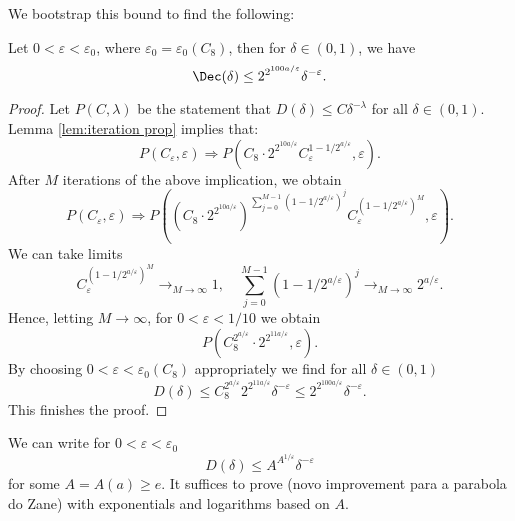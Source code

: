 We bootstrap this bound to find the following:
\begin{lem}
\label{lem:IntermediateResultMomentCurveIII}
Let $0<\varepsilon<\varepsilon_{0}$, where $\varepsilon_{0}=\varepsilon_{0}(C_{8})$, then for $\delta \in (0,1)$, we have
\begin{equation*}
\Dec(\delta) \leq 2^{2^{100a/\varepsilon}} \delta^{-\varepsilon}.
\end{equation*}
\end{lem}
\begin{proof}
Let $P(C,\lambda)$ be the statement that $D(\delta) \leq C \delta^{-\lambda}$ for all $\delta \in (0,1)$. Lemma \ref{lem:iteration prop} implies that:
\begin{equation*}
P(C_\varepsilon,\varepsilon) \Rightarrow P(C_{8} \cdot 2^{2^{10 a/\varepsilon}} C_\varepsilon^{1-1/2^{a/\varepsilon}}, \varepsilon).
\end{equation*}
After $M$ iterations of the above implication, we obtain
\begin{equation*}
P(C_\varepsilon,\varepsilon) \Rightarrow P((C_{8} \cdot 2^{2^{10 a/\varepsilon}} )^{\sum_{j=0}^{M-1} (1-1/2^{a/\varepsilon})^j} C_\varepsilon^{(1-1/2^{a/\varepsilon})^M}, \varepsilon).
\end{equation*}
We can take limits
\begin{equation*}
C_\varepsilon^{(1-1/2^{a/\varepsilon})^M} \rightarrow_{M \to \infty} 1, \quad \sum_{j=0}^{M-1} (1-1/2^{a/\varepsilon})^j \rightarrow_{M \to \infty} 2^{a/\varepsilon}.
\end{equation*}
Hence, letting $M \to \infty$, for $0<\varepsilon<1/10$ we obtain
\begin{equation*}
P(C_{8}^{2^{a/\varepsilon}} \cdot 2^{ 2^{11a/\varepsilon}}, \varepsilon).
\end{equation*}
By choosing  $0<\varepsilon<\varepsilon_0(C_{8})$ appropriately we find for all $\delta \in (0,1)$
\begin{equation*}
D(\delta) \leq C_{8}^{2^{a/\varepsilon}} 2^{2^{11 a/\varepsilon} } \delta^{-\varepsilon} \leq 2^{2^{100 a/\varepsilon}} \delta^{-\varepsilon}.
\end{equation*}
This finishes the proof.
\end{proof}


We can write for $0<\varepsilon<\varepsilon_0$
\begin{equation}
\label{eq:TripleExponentialBoundII}
D(\delta) \leq A^{A^{1/\varepsilon}} \delta^{-\varepsilon}
\end{equation}
for some $A=A(a) \geq e$. It suffices to prove (novo improvement para a parabola do Zane) with exponentials and logarithms based on $A$.

